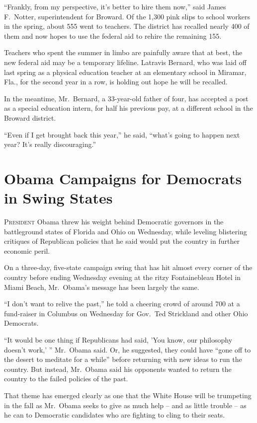 ﻿\documentclass[12pt]{article}
\begin{document}
``Frankly, from my perspective, it's better to hire them now,'' said James F.~Notter, superintendent
for Broward. Of the 1,300 pink slips to school workers in the spring, about 555 went to teachers.
The district has recalled nearly 400 of them and now hopes to use the federal aid to rehire the
remaining 155.

Teachers who spent the summer in limbo are painfully aware that at best, the new federal aid may be
a temporary lifeline. Latravis Bernard, who was laid off last spring as a physical education teacher
at an elementary school in Miramar, Fla., for the second year in a row, is holding out hope he will
be recalled.

In the meantime, Mr.~Bernard, a 33-year-old father of four, has accepted a post as a special
education intern, for half his previous pay, at a different school in the Broward district.

``Even if I get brought back this year,'' he said, ``what's going to happen next year? It's really
discouraging.''

\section{Obama Campaigns for Democrats in Swing States}

\lettrine{P}{resident} Obama threw his weight behind Democratic governors in
the battleground states of Florida and Ohio on Wednesday, while leveling blistering critiques of
Republican policies that he said would put the country in further economic peril.

On a three-day, five-state campaign swing that has hit almost every corner of the country before
ending Wednesday evening at the ritzy Fontainebleau Hotel in Miami Beach, Mr.~Obama's message has
been largely the same.

``I don't want to relive the past,'' he told a cheering crowd of around 700 at a fund-raiser in
Columbus on Wednesday for Gov.~Ted Strickland and other Ohio Democrats.

``It would be one thing if Republicans had said, 'You know, our philosophy doesn't work,' ''
Mr.~Obama said. Or, he suggested, they could have ``gone off to the desert to meditate for a while''
before returning with new ideas to run the country. But instead, Mr.~Obama said his opponents wanted
to return the country to the failed policies of the past.

That theme has emerged clearly as one that the White House will be trumpeting in the fall as
Mr.~Obama seeks to give as much help -- and as little trouble -- as he can to Democratic candidates
who are fighting to cling to their seats.
\end{document}
